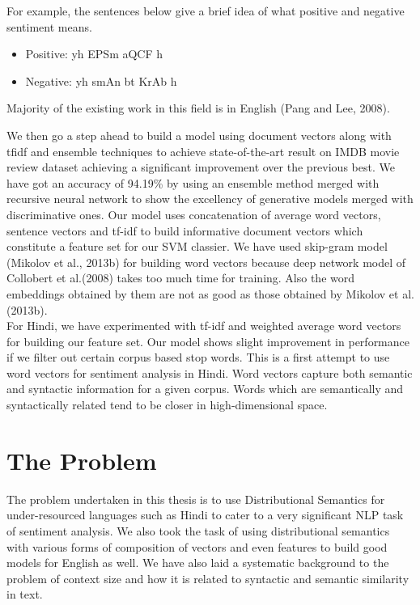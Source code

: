 For example, the sentences below give a brief idea of what positive and negative sentiment means.
\begin{itemize}
\item Positive: {\dn yh EPSm aQCF h\4}
\item Negative: {\dn yh smAn bt KrAb h\4}
\end{itemize}
Majority of the existing work in this field is in English (Pang and Lee, 2008).

We then go a step ahead to build a model using document vectors along with tfidf and ensemble techniques to achieve state-of-the-art result on IMDB movie review dataset achieving a significant improvement over the previous best. We have got an accuracy of 94.19\% by using an ensemble method merged with recursive neural network to show the excellency of generative models merged with discriminative ones.
Our model uses concatenation of average word vectors, sentence vectors and tf-idf to build informative document vectors which constitute a feature set for our SVM classier. We have used skip-gram model (Mikolov et al., 2013b) for building word vectors because deep network model of Collobert et al.(2008) takes too much time for training. Also the word embeddings obtained by them are not as good as those obtained by Mikolov et al.(2013b). \\
For Hindi, we have experimented with tf-idf and weighted average word vectors for building our feature set. Our model shows slight improvement in performance if we filter out certain corpus based stop words. This is a first attempt to use word vectors for sentiment analysis in Hindi. Word vectors capture both semantic and syntactic information for a given corpus. Words which are semantically and syntactically related tend to be closer in high-dimensional space.\\

\section{The Problem}
The problem undertaken in this thesis is to use Distributional Semantics for under-resourced languages such as Hindi to cater to a very significant NLP task of sentiment analysis. We also took the task of using distributional semantics with various forms of composition of vectors and even features to build good models for English as well. We have also laid a systematic background to the problem of context size and how it is related to syntactic and semantic similarity in text. 

